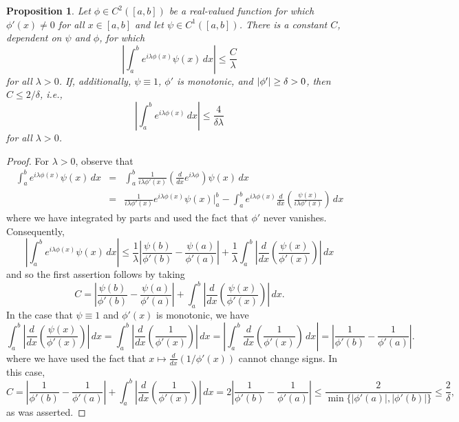 \documentclass[11pt]{article}
\newtheorem{proposition}[theorem]{Proposition}
\newcommand{\lp}{\left(}
\newcommand{\rp}{\right)}
\newcommand{\f}[2]{\frac{#1}{#2}}
\begin{document}
\begin{proposition}\label{prop:NoCriticalPoint}
Let $\phi\in C^2([a,b])$ be a real-valued function for which $\phi'(x)\neq 0$ for all $x\in [a,b]$ and let $\psi\in C^1([a,b])$. There is a constant $C$, dependent on $\psi$ and $\phi$, for which
\begin{equation*}
    \left|\int_a^b e^{i\lambda \phi(x)}\psi(x)\,dx \right|\leq \f{C}{\lambda}
\end{equation*}
for all $\lambda>0$. If, additionally, $\psi \equiv 1$, $\phi'$ is monotonic, and $\abs{\phi'} \geq \delta > 0$, then $C \leq 2/\delta$, i.e.,
\begin{equation*}
    \left|\int_a^b e^{i\lambda\phi(x)}\,dx\right|\leq \frac{4}{\delta\lambda}
\end{equation*}
for all $\lambda>0$.
\end{proposition}
\begin{proof}
For $\lambda>0$, observe that
\begin{eqnarray*}
    \int_{a}^b e^{i\lambda \phi(x)}\psi(x)\,dx  
    &=& \int_{a}^b   \f{1}{i\lambda \phi'(x)}\lp \f{d}{dx}e^{i\lambda \phi}\rp \psi(x)  \,dx \\
    &=& \f{1}{i\lambda \phi'(x)}e^{i\lambda \phi(x)}\psi(x)\bigg\vert_{a}^b 
    - \int_{a}^b  e^{i\lambda \phi(x)} \f{d}{dx}\lp \f{\psi(x)}{i\lambda \phi'(x)} \rp \,dx 
\end{eqnarray*}
where we have integrated by parts and used the fact that $\phi'$ never vanishes. Consequently,
\begin{equation*}
    \left|\int_a^b e^{i\lambda\phi(x)}\psi(x)\,dx\right|\leq \frac{1}{\lambda}\left|\frac{\psi(b)}{\phi'(b)}-\frac{\psi(a)}{\phi'(a)}\right|+\frac{1}{\lambda}\int_a^b\left|\frac{d}{dx}\left(\frac{\psi(x)}{\phi'(x)}\right)\right|\,dx
\end{equation*}
and so the first assertion follows by taking
\begin{equation*}
    C=\left|\frac{\psi(b)}{\phi'(b)}-\frac{\psi(a)}{\phi'(a)}\right|+\int_a^b\left|\frac{d}{dx}\left(\frac{\psi(x)}{\phi'(x)}\right)\right|\,dx.
\end{equation*}
In the case that $\psi\equiv 1$ and $\phi'(x)$ is monotonic, we have
\begin{equation*}
    \int_a^b\left|\frac{d}{dx}\left(\frac{\psi(x)}{\phi'(x)}\right)\right|\,dx=\int_a^b\left|\frac{d}{dx}\left(\frac{1}{\phi'(x)}\right)\right|\,dx=\left|\int_a^b\frac{d}{dx}\left(\frac{1}{\phi'(x)}\right)\,dx\right|=\left|\frac{1}{\phi'(b)}-\frac{1}{\phi'(a)}\right|.
\end{equation*}
where we have used the fact that $x\mapsto \frac{d}{dx}(1/\phi'(x))$ cannot change signs. In this case,
\begin{equation*}
 C=\left|\frac{1}{\phi'(b)}-\frac{1}{\phi'(a)}\right|+\int_a^b\left|\frac{d}{dx}\left(\frac{1}{\phi'(x)}\right)\right|\,dx=2\left|\frac{1}{\phi'(b)}-\frac{1}{\phi'(a)}\right|\leq \frac{2}{\min\{|\phi'(a)|,|\phi'(b)|\}}\leq\frac{2}{\delta},
\end{equation*}
as was asserted.
\end{proof}
\end{document}
